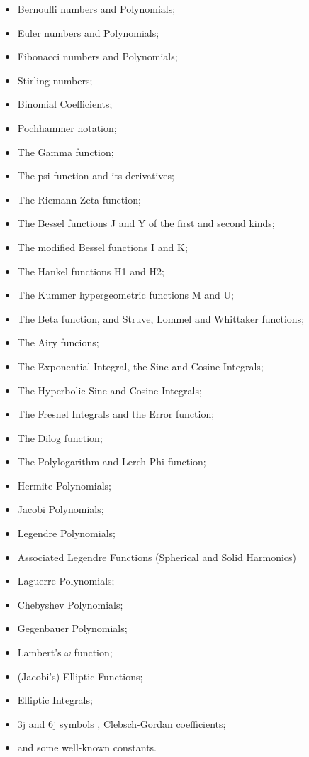 \documentclass[11pt]{article}
\begin{document}
\begin{itemize}
\item Bernoulli numbers and Polynomials;
\item Euler numbers and Polynomials;
\item Fibonacci numbers and Polynomials;
\item Stirling numbers;
\item Binomial Coefficients;
\item Pochhammer notation;
\item The Gamma function;
\item The psi function and its derivatives;
\item The Riemann Zeta function;
\item The Bessel functions J and Y of the first and second kinds;
\item The modified Bessel functions I and K;
\item The Hankel functions H1 and H2;
\item The Kummer hypergeometric functions M and U;
\item The Beta function, and Struve, Lommel and Whittaker functions;
\item The Airy funcions;
\item The Exponential Integral, the Sine and Cosine Integrals;
\item The Hyperbolic Sine and Cosine Integrals;
\item The Fresnel Integrals and the Error function;
\item The Dilog function;
\item The Polylogarithm and Lerch Phi function;
\item Hermite Polynomials;
\item Jacobi Polynomials;
\item Legendre Polynomials;
\item Associated Legendre Functions (Spherical and Solid Harmonics)
\item Laguerre Polynomials;
\item Chebyshev Polynomials;
\item Gegenbauer Polynomials;
\item Lambert's $\omega$ function;
\item (Jacobi's) Elliptic Functions;
\item Elliptic Integrals;
\item 3j and 6j symbols , Clebsch-Gordan coefficients;
\item and some well-known constants.
\end{itemize}
\end{document}
